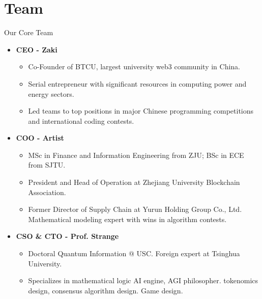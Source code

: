 \documentclass{beamer}
\begin{document}
\section{Team}

\begin{frame}{Our Core Team}
    \begin{itemize}
        \item \textbf{CEO - Zaki}
\begin{scriptsize}
        \begin{itemize}
            \item Co-Founder of BTCU, largest university web3 community in China.
            \item Serial entrepreneur with significant resources in computing power and energy sectors.
            \item Led teams to top positions in major Chinese programming competitions and international coding contests.
        \end{itemize}
\end{scriptsize}
        
        \item \textbf{COO - Artist}
\begin{scriptsize}
        \begin{itemize}
            \item MSc in Finance and Information Engineering from ZJU; BSc in ECE from SJTU.
            \item President and Head of Operation at Zhejiang University Blockchain Association.
            \item Former Director of Supply Chain at Yurun Holding Group Co., Ltd. Mathematical modeling expert with wins in algorithm contests.
        \end{itemize}
\end{scriptsize}
        
        \item \textbf{CSO \& CTO - Prof. Strange}
\begin{scriptsize}
        \begin{itemize}
            \item Doctoral Quantum Information @ USC. Foreign expert at Tsinghua University.
            \item Specializes in mathematical logic AI engine, AGI philosopher. tokenomics design, consensus algorithm design. Game design. 
        \end{itemize}
\end{scriptsize}
    \end{itemize}
\end{frame}
\end{document}
